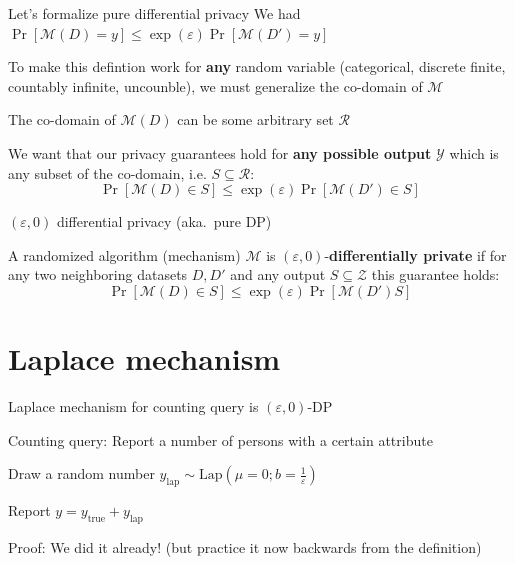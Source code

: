 \documentclass[12pt,aspectratio=169,handout]{beamer}
\begin{document}
\begin{frame}{Let's formalize pure differential privacy}
We had $\Pr[\mathcal{M}(D) = y] \leq \exp(\varepsilon) \Pr[\mathcal{M}(D') = y]$

To make this defintion work for \textbf{any} random variable (categorical, discrete finite, countably infinite, uncounble), we must generalize the co-domain of $\mathcal{M}$

The co-domain of $\mathcal{M}(D)$ can be some arbitrary set $\mathcal{R}$

We want that our privacy guarantees hold for \textbf{any possible output} $\mathcal{Y}$ which is any subset of the co-domain, i.e. $S \subseteq \mathcal{R}$:
$$
\Pr[\mathcal{M}(D) \in S] \leq \exp(\varepsilon) \Pr[\mathcal{M}(D') \in S]
$$


\end{frame}


\begin{frame}{$(\varepsilon, 0)$ differential privacy (aka.\ pure DP)}

A randomized algorithm (mechanism) $\mathcal{M}$ is $(\varepsilon, 0)$-\textbf{differentially private} if for any two neighboring datasets $D, D'$ and any output $S \subseteq \mathcal{Z}$ this guarantee holds:
$$
\Pr[\mathcal{M}(D) \in S] \leq \exp(\varepsilon) \Pr[\mathcal{M}(D') S]
$$


\end{frame}


\section{Laplace mechanism}

\begin{frame}{Laplace mechanism for counting query is $(\varepsilon, 0)$-DP}

Counting query: Report a number of persons with a certain attribute

Draw a random number $y_{\mathrm{lap}} \sim \textrm{Lap}(\mu = 0; b=\frac{1}{\varepsilon})$

Report $y = y_{\mathrm{true}} + y_{\mathrm{lap}}$


Proof: We did it already! (but practice it now backwards from the definition)


\end{frame}
\end{document}
